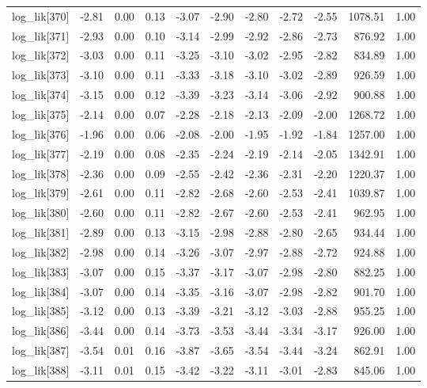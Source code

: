 \begin{table}[ht]
\begin{tabular}{rrrrrrrrrrr}
  log\_lik[370] & -2.81 & 0.00 & 0.13 & -3.07 & -2.90 & -2.80 & -2.72 & -2.55 & 1078.51 & 1.00 \\ 
  log\_lik[371] & -2.93 & 0.00 & 0.10 & -3.14 & -2.99 & -2.92 & -2.86 & -2.73 & 876.92 & 1.00 \\ 
  log\_lik[372] & -3.03 & 0.00 & 0.11 & -3.25 & -3.10 & -3.02 & -2.95 & -2.82 & 834.89 & 1.00 \\ 
  log\_lik[373] & -3.10 & 0.00 & 0.11 & -3.33 & -3.18 & -3.10 & -3.02 & -2.89 & 926.59 & 1.00 \\ 
  log\_lik[374] & -3.15 & 0.00 & 0.12 & -3.39 & -3.23 & -3.14 & -3.06 & -2.92 & 900.88 & 1.00 \\ 
  log\_lik[375] & -2.14 & 0.00 & 0.07 & -2.28 & -2.18 & -2.13 & -2.09 & -2.00 & 1268.72 & 1.00 \\ 
  log\_lik[376] & -1.96 & 0.00 & 0.06 & -2.08 & -2.00 & -1.95 & -1.92 & -1.84 & 1257.00 & 1.00 \\ 
  log\_lik[377] & -2.19 & 0.00 & 0.08 & -2.35 & -2.24 & -2.19 & -2.14 & -2.05 & 1342.91 & 1.00 \\ 
  log\_lik[378] & -2.36 & 0.00 & 0.09 & -2.55 & -2.42 & -2.36 & -2.31 & -2.20 & 1220.37 & 1.00 \\ 
  log\_lik[379] & -2.61 & 0.00 & 0.11 & -2.82 & -2.68 & -2.60 & -2.53 & -2.41 & 1039.87 & 1.00 \\ 
  log\_lik[380] & -2.60 & 0.00 & 0.11 & -2.82 & -2.67 & -2.60 & -2.53 & -2.41 & 962.95 & 1.00 \\ 
  log\_lik[381] & -2.89 & 0.00 & 0.13 & -3.15 & -2.98 & -2.88 & -2.80 & -2.65 & 934.44 & 1.00 \\ 
  log\_lik[382] & -2.98 & 0.00 & 0.14 & -3.26 & -3.07 & -2.97 & -2.88 & -2.72 & 924.88 & 1.00 \\ 
  log\_lik[383] & -3.07 & 0.00 & 0.15 & -3.37 & -3.17 & -3.07 & -2.98 & -2.80 & 882.25 & 1.00 \\ 
  log\_lik[384] & -3.07 & 0.00 & 0.14 & -3.35 & -3.16 & -3.07 & -2.98 & -2.82 & 901.70 & 1.00 \\ 
  log\_lik[385] & -3.12 & 0.00 & 0.13 & -3.39 & -3.21 & -3.12 & -3.03 & -2.88 & 955.25 & 1.00 \\ 
  log\_lik[386] & -3.44 & 0.00 & 0.14 & -3.73 & -3.53 & -3.44 & -3.34 & -3.17 & 926.00 & 1.00 \\ 
  log\_lik[387] & -3.54 & 0.01 & 0.16 & -3.87 & -3.65 & -3.54 & -3.44 & -3.24 & 862.91 & 1.00 \\ 
  log\_lik[388] & -3.11 & 0.01 & 0.15 & -3.42 & -3.22 & -3.11 & -3.01 & -2.83 & 845.06 & 1.00 \\ 

\end{tabular}
\end{table}
